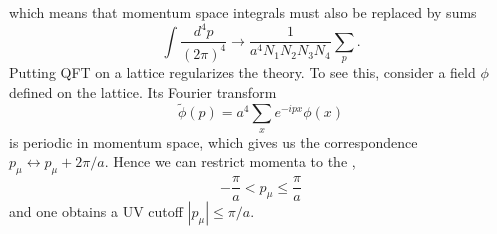 which means that momentum space integrals must also be replaced by
sums
\begin{equation}
  \int\frac{d^4p}{(2\pi)^4}\to
  \frac{1}{a^4N_1N_2N_3N_4}\sum_p. 
\end{equation}
Putting QFT on a lattice regularizes the theory. 
To see this, consider a field $\phi$ defined on the lattice. 
Its Fourier transform
\begin{equation}
  \widetilde{\phi}(p)=a^4\sum_xe^{-ipx}\phi(x)
\end{equation}
is periodic in momentum space, which gives us the correspondence
$p_\mu\leftrightarrow p_\mu+2\pi/a$. Hence we can restrict
momenta to the ,
\begin{equation}
 -\frac{\pi}{a}<p_\mu\le\frac{\pi}{a}
\end{equation}
and one obtains a UV cutoff $|p_\mu|\le\pi/a$.

